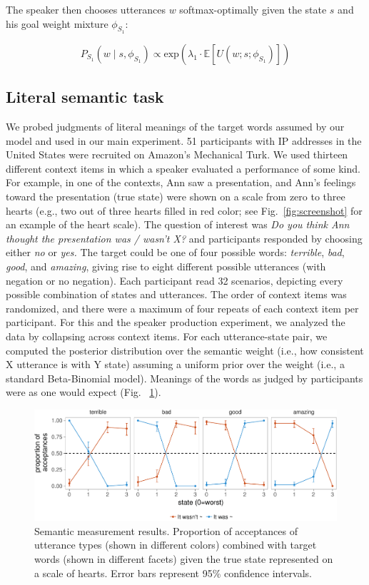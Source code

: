 \documentclass[9pt,twocolumn,twoside,lineno]{main_class_file}
\begin{document}
{\noindent The speaker then chooses utterances $w$ softmax-optimally given the state $s$ and his goal weight mixture $\phi_{S_1}$: 

\begin{equation} 
P_{S_1}(w \mid s, \phi_{S_1}) \propto \mathrm{exp}(\lambda_{1} \cdot \mathbb{E}[U(w; s; \phi_{S_1})])
\end{equation}


\subsection*{Literal semantic task}\label{literal-semantic-task}

We probed judgments of literal meanings of the target words assumed by
our model and used in our main experiment. 51 participants with IP
addresses in the United States were recruited on Amazon's Mechanical
Turk. We used thirteen different context items in which a speaker
evaluated a performance of some kind. For example, in one of the
contexts, Ann saw a presentation, and Ann's feelings toward the
presentation (true state) were shown on a scale from zero to three
hearts (e.g., two out of three hearts filled in red color; see
Fig.~\ref{fig:screenshot} for an example of the heart scale). The
question of interest was \emph{Do you think Ann thought the
presentation was / wasn't X?} and participants responded by choosing
either \emph{no} or \emph{yes.} The target could be one of four
possible words: \emph{terrible}, \emph{bad}, \emph{good}, and
\emph{amazing}, giving rise to eight different possible utterances (with
negation or no negation). Each participant read 32 scenarios, depicting
every possible combination of states and utterances. The order of
context items was randomized, and there were a maximum of four repeats
of each context item per participant. For this and the speaker
production experiment, we analyzed the data by collapsing across context
items. For each utterance-state pair, we computed the posterior
distribution over the semantic weight (i.e., how consistent X utterance
is with Y state) assuming a uniform prior over the weight (i.e., a
standard Beta-Binomial model). Meanings of the words as judged by
participants were as one would expect (Fig. ~\ref{fig:litsem}).

\begin{figure}[!h]
\includegraphics[width=0.9\columnwidth]{fig/litsem-1}
\centering \caption{Semantic measurement results. Proportion of acceptances of utterance types (shown in different colors) combined with target words (shown in different facets) given the true state represented on a scale of hearts. Error bars represent 95\% confidence intervals.}\label{fig:litsem}
\end{figure}

}
\end{document}
